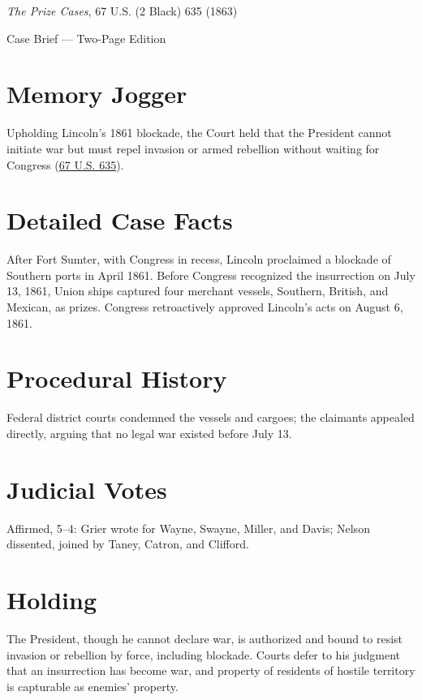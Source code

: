 \documentclass[12pt]{article}
\begin{document}
\begin{center}
{\LARGE \textit{The Prize Cases}, 67 U.S. (2 Black) 635 (1863)\par}
\vspace{0.5em}
{\large Case Brief --- Two-Page Edition\par}
\end{center}

\section{Memory Jogger}
Upholding Lincoln's 1861 blockade, the Court held that the President cannot initiate war but must repel invasion or armed rebellion without waiting for Congress (\href{https://supreme.justia.com/cases/federal/us/67/635/}{67 U.S. 635}).

\section{Detailed Case Facts}
After Fort Sumter, with Congress in recess, Lincoln proclaimed a blockade of Southern ports in April 1861. Before Congress recognized the insurrection on July 13, 1861, Union ships captured four merchant vessels, Southern, British, and Mexican, as prizes. Congress retroactively approved Lincoln's acts on August 6, 1861.

\section{Procedural History}
Federal district courts condemned the vessels and cargoes; the claimants appealed directly, arguing that no legal war existed before July 13.

\section{Judicial Votes}
Affirmed, 5--4: Grier wrote for Wayne, Swayne, Miller, and Davis; Nelson dissented, joined by Taney, Catron, and Clifford.

\section{Holding}
The President, though he cannot declare war, is authorized and bound to resist invasion or rebellion by force, including blockade. Courts defer to his judgment that an insurrection has become war, and property of residents of hostile territory is capturable as enemies' property.
\end{document}
